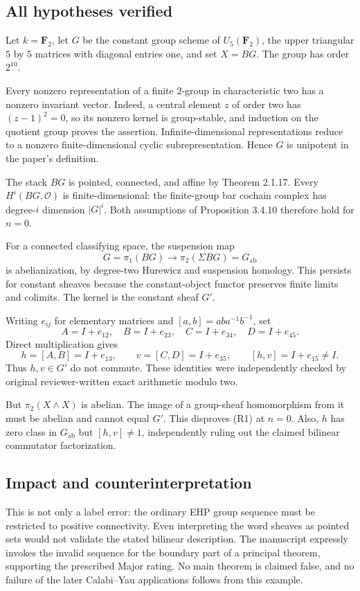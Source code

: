 \documentclass[10pt]{article}
\begin{document}
\subsection*{All hypotheses verified}
Let \(k=\mathbf F_2\), let \(G\) be the constant group scheme of \(U_5(\mathbf F_2)\), the upper triangular \(5\) by \(5\) matrices with diagonal entries one, and set \(X=BG\). The group has order \(2^{10}\).\par
Every nonzero representation of a finite \(2\)-group in characteristic two has a nonzero invariant vector. Indeed, a central element \(z\) of order two has \((z-1)^2=0\), so its nonzero kernel is group-stable, and induction on the quotient group proves the assertion. Infinite-dimensional representations reduce to a nonzero finite-dimensional cyclic subrepresentation. Hence \(G\) is unipotent in the paper’s definition.\par
The stack \(BG\) is pointed, connected, and affine by Theorem 2.1.17. Every \(H^i(BG,\mathcal O)\) is finite-dimensional: the finite-group bar cochain complex has degree-\(i\) dimension \(|G|^i\). Both assumptions of Proposition 3.4.10 therefore hold for \(n=0\).\par
For a connected classifying space, the suspension map \[G=\pi_1(BG)\longrightarrow\pi_2(\Sigma BG)=G_{\mathrm{ab}}\] is abelianization, by degree-two Hurewicz and suspension homology. This persists for constant sheaves because the constant-object functor preserves finite limits and colimits. The kernel is the constant sheaf \(G'\).\par
Writing \(e_{ij}\) for elementary matrices and \([a,b]=aba^{-1}b^{-1}\), set \[A=I+e_{12},\quad B=I+e_{23},\quad
 C=I+e_{34},\quad D=I+e_{45}.\] Direct multiplication gives \[h=[A,B]=I+e_{13},\qquad v=[C,D]=I+e_{35},
 \qquad [h,v]=I+e_{15}\ne I. \tag{R2}\] Thus \(h,v\in G'\) do not commute. These identities were independently checked by original reviewer-written exact arithmetic modulo two.\par
But \(\pi_2(X\wedge X)\) is abelian. The image of a group-sheaf homomorphism from it must be abelian and cannot equal \(G'\). This disproves (R1) at \(n=0\). Also, \(h\) has zero class in \(G_{\mathrm{ab}}\) but \([h,v]\ne1\), independently ruling out the claimed bilinear commutator factorization.\par
\subsection*{Impact and counterinterpretation}
This is not only a label error: the ordinary EHP group sequence must be restricted to positive connectivity. Even interpreting the word sheaves as pointed sets would not validate the stated bilinear description. The manuscript expressly invokes the invalid sequence for the boundary part of a principal theorem, supporting the prescribed Major rating. No main theorem is claimed false, and no failure of the later Calabi–Yau applications follows from this example.\par
\end{document}
